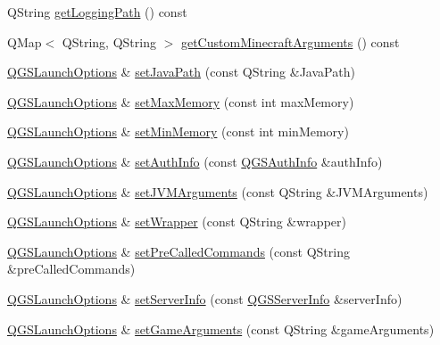 \begin{DoxyCompactItemize}
Q\+String \mbox{\hyperlink{class_q_g_s_launch_options_ac7540dd39170f5c519ed81ad8a097414}{get\+Logging\+Path}} () const
\item 
Q\+Map$<$ Q\+String, Q\+String $>$ \mbox{\hyperlink{class_q_g_s_launch_options_a0060165a4bb3bfdb0fe5b12f82e6245f}{get\+Custom\+Minecraft\+Arguments}} () const
\item 
\mbox{\hyperlink{class_q_g_s_launch_options}{Q\+G\+S\+Launch\+Options}} \& \mbox{\hyperlink{class_q_g_s_launch_options_ad7d35e501843533f937c70d88d8b380c}{set\+Java\+Path}} (const Q\+String \&Java\+Path)
\item 
\mbox{\hyperlink{class_q_g_s_launch_options}{Q\+G\+S\+Launch\+Options}} \& \mbox{\hyperlink{class_q_g_s_launch_options_a8449319a5e0689692af5a43e4ea6e95b}{set\+Max\+Memory}} (const int max\+Memory)
\item 
\mbox{\hyperlink{class_q_g_s_launch_options}{Q\+G\+S\+Launch\+Options}} \& \mbox{\hyperlink{class_q_g_s_launch_options_a9829e05bc487208389b7370dfa1b1f47}{set\+Min\+Memory}} (const int min\+Memory)
\item 
\mbox{\hyperlink{class_q_g_s_launch_options}{Q\+G\+S\+Launch\+Options}} \& \mbox{\hyperlink{class_q_g_s_launch_options_a6b10f450522defde64ba05fb69107620}{set\+Auth\+Info}} (const \mbox{\hyperlink{class_q_g_s_auth_info}{Q\+G\+S\+Auth\+Info}} \&auth\+Info)
\item 
\mbox{\hyperlink{class_q_g_s_launch_options}{Q\+G\+S\+Launch\+Options}} \& \mbox{\hyperlink{class_q_g_s_launch_options_ab722b1bdfe5a88c9746d404d246febb3}{set\+J\+V\+M\+Arguments}} (const Q\+String \&J\+V\+M\+Arguments)
\item 
\mbox{\hyperlink{class_q_g_s_launch_options}{Q\+G\+S\+Launch\+Options}} \& \mbox{\hyperlink{class_q_g_s_launch_options_a9f726b4c4f8853b42f978f33fe9867b2}{set\+Wrapper}} (const Q\+String \&wrapper)
\item 
\mbox{\hyperlink{class_q_g_s_launch_options}{Q\+G\+S\+Launch\+Options}} \& \mbox{\hyperlink{class_q_g_s_launch_options_a431ecc151cb9aeff0dc2e72e923c9b57}{set\+Pre\+Called\+Commands}} (const Q\+String \&pre\+Called\+Commands)
\item 
\mbox{\hyperlink{class_q_g_s_launch_options}{Q\+G\+S\+Launch\+Options}} \& \mbox{\hyperlink{class_q_g_s_launch_options_af7af4328eaf708252b5aaca674fcd7f8}{set\+Server\+Info}} (const \mbox{\hyperlink{class_q_g_s_server_info}{Q\+G\+S\+Server\+Info}} \&server\+Info)
\item 
\mbox{\hyperlink{class_q_g_s_launch_options}{Q\+G\+S\+Launch\+Options}} \& \mbox{\hyperlink{class_q_g_s_launch_options_a156e2a1da90fac4e6d133e7c81590809}{set\+Game\+Arguments}} (const Q\+String \&game\+Arguments)

\end{DoxyCompactItemize}
